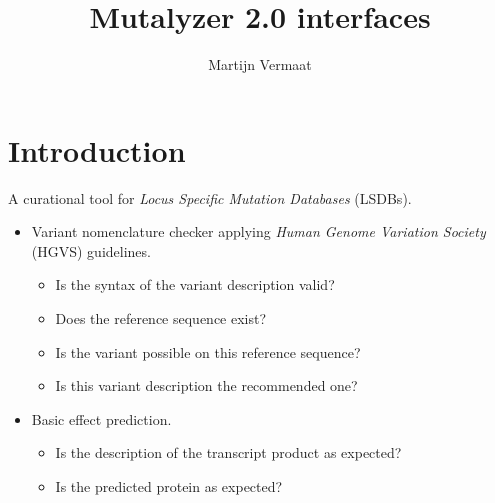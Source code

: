 \documentclass[slidestop]{beamer}
\title{Mutalyzer 2.0 interfaces}
\author{Martijn Vermaat}
\begin{document}



\bodytemplate

\section{Introduction}
\begin{frame}
  A curational tool for \emph{Locus Specific Mutation Databases} (LSDBs).

  \bigskip
  \begin{itemize}
    \pause
    \item Variant nomenclature checker applying \emph{Human Genome Variation
          Society} (HGVS) guidelines.
    \begin{itemize}
      \item Is the syntax of the variant description valid?
      \item Does the reference sequence exist?
      \item Is the variant possible on this reference sequence?
      \item Is this variant description the recommended one?
    \end{itemize}
    \pause
    \item Basic effect prediction.
    \begin{itemize}
      \item Is the description of the transcript product as expected?
      \item Is the predicted protein as expected?
    \end{itemize}
  \end{itemize}
\end{frame}
\end{document}
